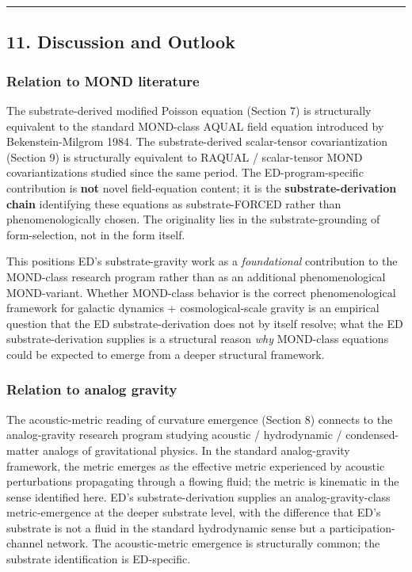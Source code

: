 \documentclass[
  11pt,a4paper]{article}
\begin{document}
\begin{center}\rule{0.5\linewidth}{0.5pt}\end{center}

\subsection{11. Discussion and Outlook}\label{discussion-and-outlook}

\subsubsection{Relation to MOND
literature}\label{relation-to-mond-literature}

The substrate-derived modified Poisson equation (Section 7) is
structurally equivalent to the standard MOND-class AQUAL field equation
introduced by Bekenstein-Milgrom 1984. The substrate-derived
scalar-tensor covariantization (Section 9) is structurally equivalent to
RAQUAL / scalar-tensor MOND covariantizations studied since the same
period. The ED-program-specific contribution is \textbf{not} novel
field-equation content; it is the \textbf{substrate-derivation chain}
identifying these equations as substrate-FORCED rather than
phenomenologically chosen. The originality lies in the
substrate-grounding of form-selection, not in the form itself.

This positions ED's substrate-gravity work as a \emph{foundational}
contribution to the MOND-class research program rather than as an
additional phenomenological MOND-variant. Whether MOND-class behavior is
the correct phenomenological framework for galactic dynamics +
cosmological-scale gravity is an empirical question that the ED
substrate-derivation does not by itself resolve; what the ED
substrate-derivation supplies is a structural reason \emph{why}
MOND-class equations could be expected to emerge from a deeper
structural framework.

\subsubsection{Relation to analog
gravity}\label{relation-to-analog-gravity}

The acoustic-metric reading of curvature emergence (Section 8) connects
to the analog-gravity research program studying acoustic / hydrodynamic
/ condensed-matter analogs of gravitational physics. In the standard
analog-gravity framework, the metric emerges as the effective metric
experienced by acoustic perturbations propagating through a flowing
fluid; the metric is kinematic in the sense identified here. ED's
substrate-derivation supplies an analog-gravity-class metric-emergence
at the deeper substrate level, with the difference that ED's substrate
is not a fluid in the standard hydrodynamic sense but a
participation-channel network. The acoustic-metric emergence is
structurally common; the substrate identification is ED-specific.
\end{document}
